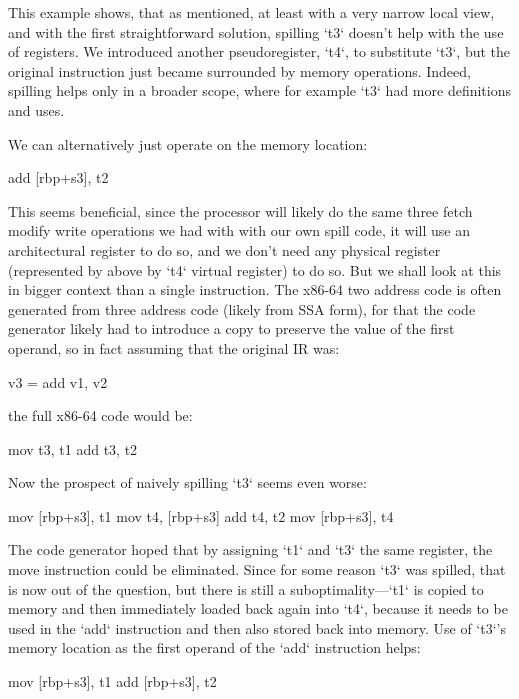 This example shows, that as mentioned, at least with a very narrow local
view, and with the first straightforward solution, spilling `t3` doesn't help with the
use of registers. We introduced another pseudoregister, `t4`, to substitute
`t3`, but the original instruction just became surrounded by memory operations.
Indeed, spilling helps only in a broader scope, where for example `t3` had more
definitions and uses.

We can alternatively just operate on the memory location:

\begtt
add [rbp+s3], t2
\endtt

This seems beneficial, since the processor will likely do the same three fetch modify
write operations we had with with our own spill code, it will use an
architectural register to do so, and we don't need any physical register
(represented by above by `t4` virtual register) to do so. But we shall look at
this in bigger context than a single instruction. The x86-64 two address code is
often generated from three address code (likely from SSA form), for that the
code generator likely had to introduce a copy to preserve the value of the first
operand, so in fact assuming that the original IR was:

\begtt
v3 = add v1, v2
\endtt

the full x86-64 code would be:

\begtt
mov t3, t1
add t3, t2
\endtt

Now the prospect of naively spilling `t3` seems even worse:

\begtt
mov [rbp+s3], t1
mov t4, [rbp+s3]
add t4, t2
mov [rbp+s3], t4
\endtt

The code generator hoped that by assigning `t1` and `t3` the same register, the
move instruction could be eliminated. Since for some reason `t3` was spilled,
that is now out of the question, but there is still a suboptimality---`t1` is
copied to memory and then immediately loaded back again into `t4`, because it
needs to be used in the `add` instruction and then also stored back into memory.
Use of `t3`'s memory location as the first operand of the `add` instruction
helps:

\begtt
mov [rbp+s3], t1
add [rbp+s3], t2
\endtt

